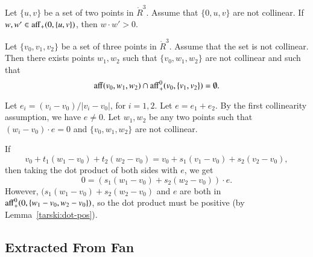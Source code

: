 \begin{tarskidata}
\begin{tarski}
\begin{lemma}
Let $\{u,v\}$ be a set of two points in $\ring{R}^3$.
Assume that $\{0,u,v\}$ are not collinear.
If $w,w'\in{\operatorname{aff}}_+(0,\{u,v\})$, then
$w\cdot w' > 0$.
\end{lemma}

\begin{proved}
\swallowed\end{proved}
\end{tarski}



\begin{tarski}

\begin{lemma}
Let $\{v_0,v_1,v_2\}$ be a set of three points in $\ring{R}^3$.
Assume that the set is not collinear.  Then there exists points
$w_1,w_2$ such that $\{v_0,w_1,w_2\}$ are not collinear and such
that 
   $$
   {\operatorname{aff}}(v_0,w_1,w_2)\cap {\operatorname{aff}}_+^0(v_0,\{v_1,v_2\})=\emptyset .
   $$
\end{lemma}

\begin{proved}
Let $e_i = (v_i-v_0)/|v_i-v_0|$, for $i=1,2$. Let 
$e = e_1+e_2$.  By the first collinearity assumption, we have
$e\ne 0$.  Let $w_1,w_2$ be any two points such that
$(w_i-v_0)\cdot e = 0$ and $\{v_0,w_1,w_2\}$ are not collinear.

If 
 $$
 v_0 + t_1 (w_1-v_0) + t_2 (w_2-v_0)=v_0 + s_1 (v_1-v_0) + s_2 (v_2-v_0),
 $$
then taking the dot product of both sides with $e$, we get
$$
  0 = (s_1 (w_1-v_0) + s_2 (w_2-v_0))\cdot e.
$$
However, $(s_1 (w_1-v_0) + s_2 (w_2-v_0)$ and $e$ are both
in ${\operatorname{aff}}_+^0(0,\{w_1-v_0,w_2-v_0\})$, so the dot product
must be positive (by Lemma~\ref{tarski:dot-pos}).
\swallowed\end{proved}
\end{tarski}






\begin{tarski}
\section{Extracted From Fan}


\end{tarski}
\end{tarskidata}
